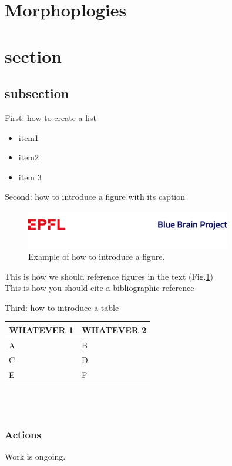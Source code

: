 
\section{Morphoplogies}

\section{section}

\subsection{subsection}

First: how to create a list
\begin{itemize}
\item item1
\item item2
\item item 3
\end{itemize}

Second: how to introduce a figure with its caption
\begin{figure}[h!]
\includegraphics[width=0.8\textwidth]{figs/Last.png}
\caption{Example of how to introduce a figure.}
\label{fig_test}
\end{figure}


This is how we should reference figures in the text (Fig.\ref{fig_test}) \\

This is how you should cite a bibliographic reference \citet{richardson2008measurement}

Third: how to introduce a table\\

\begin{tabular}{ | p{5cm} | p{5cm} |}\hline
WHATEVER 1 & WHATEVER 2 \\ \hline
A & B\\ \hline
C & D\\ \hline
E & F\\ \hline
\end{tabular}\\ \\


\subsubsection{Actions}
Work is ongoing.

